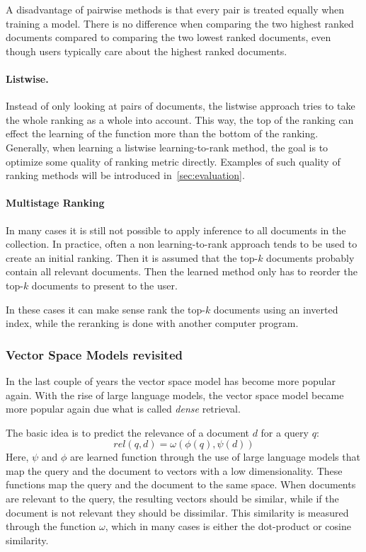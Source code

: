 A disadvantage of pairwise methods is that every pair is treated equally when training a model. There is no difference when comparing the two highest ranked documents compared to comparing the two lowest ranked documents, even though users typically care about the highest ranked documents. 

\paragraph{Listwise.} Instead of only looking at pairs of documents, the listwise approach tries to take the whole ranking as a whole into account. This way, the top of the ranking can effect the learning of the function more than the bottom of the ranking.
Generally, when learning a listwise learning-to-rank method, the goal is to optimize some quality of ranking metric directly. Examples of such quality of ranking methods will be introduced in~\cref{sec:evaluation}.

\paragraph{Multistage Ranking}
\label{sec:multistage}
In many cases it is still not possible to apply inference to all documents in the collection. In practice, often a non learning-to-rank approach tends to be used to create an initial ranking. Then it is assumed that the top-$k$ documents probably contain all relevant documents. Then the learned method only has to reorder the top-$k$ documents to present to the user. 

In these cases it can make sense rank the top-$k$ documents using an inverted index, while the reranking is done with another computer program.
 
\subsubsection{Vector Space Models revisited}
In the last couple of years the vector space model has become more popular again. With the rise of large language models, the vector space model became more popular again due what is called \emph{dense} retrieval.  

The basic idea is to predict the relevance of a document $d$ for a query $q$:
\begin{equation}
	\mathit{rel}(q, d) = \omega\left(\phi\left(q\right),
	\psi\left(d\right)\right)
\end{equation}
Here, $\psi$ and $\phi$ are learned function through the use of large language models that map the query and the document to vectors with a low dimensionality. These functions map the query and the document to the same space. When documents are relevant to the query, the resulting vectors should be similar, while if the document is not relevant they should be dissimilar. This similarity is measured through the function $\omega$, which in many cases is either the dot-product or cosine similarity.

